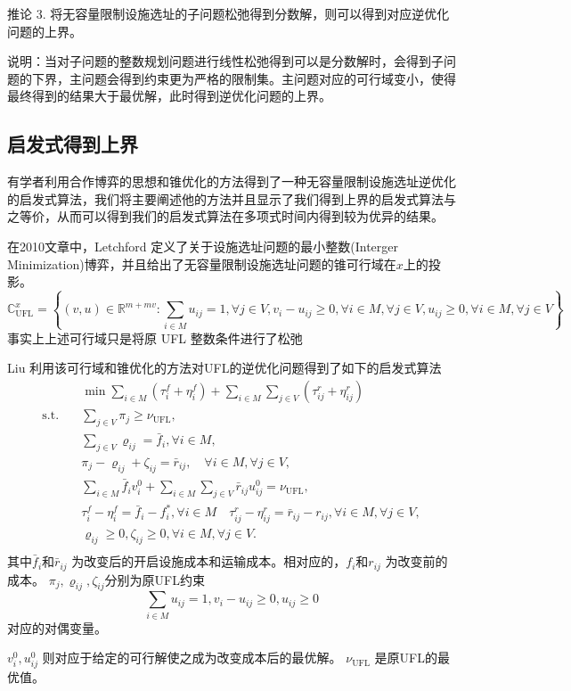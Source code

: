 \documentclass[UTF8]{article}
\begin{document}
推论 3. 将无容量限制设施选址的子问题松弛得到分数解，则可以得到对应逆优化问题的上界。

说明：当对子问题的整数规划问题进行线性松弛得到可以是分数解时，会得到子问题的下界，主问题会得到约束更为严格的限制集。主问题对应的可行域变小，使得最终得到的结果大于最优解，此时得到逆优化问题的上界。

\subsection{启发式得到上界}
有学者利用合作博弈的思想和锥优化的方法得到了一种无容量限制设施选址逆优化的启发式算法，我们将主要阐述他的方法并且显示了我们得到上界的启发式算法与之等价，从而可以得到我们的启发式算法在多项式时间内得到较为优异的结果。

在2010文章中，Letchford 定义了关于设施选址问题的最小整数(Interger Minimization)博弈，并且给出了无容量限制设施选址问题的锥可行域在$x$上的投影。
\[
\mathbb{C}_{\mathrm{UFL}}^{x}=\left\{(v, u) \in \mathbb{R}^{m+m v}: \sum_{i \in M} u_{i j}=1, \forall j \in V, v_{i}-u_{i j} \geq 0, \forall i \in M, \forall j \in V, u_{i j} \geq 0, \forall i \in M, \forall j \in V\right\}
\]
事实上上述可行域只是将原 UFL 整数条件进行了松弛

Liu 利用该可行域和锥优化的方法对UFL的逆优化问题得到了如下的启发式算法
\begin{equation}
\begin{aligned}
&\min \sum_{i \in M} \left(\tau_{i}^{f}+\eta_{i}^{f}\right)+\sum_{i \in M} \sum_{j \in V} \left(\tau_{i j}^r+\eta_{i j}^{r}\right) \\
\text{s.t.} \quad &\sum_{j \in V} \pi_{j} \geq \nu_{\mathrm{UFL}}, \\
&\sum_{j \in V} \varrho_{i j}=\bar{f}_{i}, \forall i \in M, \\
&\pi_{j}-\varrho_{i j}+\zeta_{i j}=\bar{r}_{i j}, \quad \forall i \in M, \forall j \in V, \\
&\sum_{i \in M} \bar{f}_{i} v_{i}^{0}+\sum_{i \in M} \sum_{j \in V} \bar{r}_{i j} u_{i j}^{0}=\nu_{\mathrm{UFL}}, \\
& \tau_{i}^{f}-\eta_{i}^{f}=\bar{f}_{i}-f_{i}^{*}, \forall i \in M \quad \tau_{i j}^{r}-\eta_{i j}^{r}=\bar{r}_{i j}-r_{i j}, \forall i \in M, \forall j \in V, \\
& \varrho_{i j} \geq 0, \zeta_{i j} \geq 0, \forall i \in M, \forall j \in V. \\
\end{aligned}
\end{equation}
其中$\bar{f}_{i}$和$\bar{r}_{ij}$ 为改变后的开启设施成本和运输成本。相对应的，$f_{i}$和$r_{ij}$ 为改变前的成本。
$\pi_{j},\varrho_{i j},\zeta_{i j}$分别为原UFL约束
\begin{equation*}
\sum_{i \in M} u_{ij} = 1,
v_i - u_{ij} \geq 0,
u_{ij} \geq 0
\end{equation*}
对应的对偶变量。 \par
$v_{i}^{0},u_{i j}^{0}$ 则对应于给定的可行解使之成为改变成本后的最优解。
$\nu_{\mathrm{UFL}}$ 是原UFL的最优值。
\end{document}

